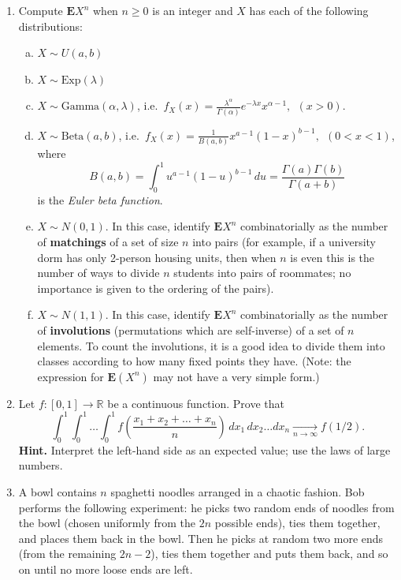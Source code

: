 \documentclass[12pt]{article}
\newcommand{\R}{\mathbb{R}}
\newcommand{\expec}{\mathbf{E}}
\theoremstyle{example}
\begin{document}
\begin{enumerate}
\item
Compute $\expec X^n$ when $n\ge 0$ is an integer and $X$ has each of the following distributions:
\begin{enumerate}[(a)]
\item $X\sim U(a,b)$
\item $X\sim \textrm{Exp}(\lambda)$
\item $X\sim \textrm{Gamma}(\alpha, \lambda)$,
i.e.\ $f_{X}(x) = \frac{\lambda^\alpha}{\Gamma(\alpha)}e^{-\lambda x} x^{\alpha-1}, \ \  (x>0)$.
\item $X\sim \textrm{Beta}(a, b)$,
i.e.\ $f_X(x) = \frac{1}{B(a,b)} x^{a-1} (1-x)^{b-1}, \ \  (0<x<1)$,
where $$ B(a,b)=\int_0^1 u^{a-1}(1-u)^{b-1}\,du = \frac{\Gamma(a)\Gamma(b)}{\Gamma(a+b)}$$
is the \emph{Euler beta function}.
\item $X\sim N(0,1)$. In this case, identify $\expec X^n$ combinatorially as the number of \textbf{matchings} of a set of size $n$ into pairs (for example, if a university dorm has only 2-person housing units, then when $n$ is even this is the number of ways to divide $n$ students into pairs of roommates; no importance is given to the ordering of the pairs).
\item $X\sim N(1,1)$. In this case, identify $\expec X^n$ combinatorially as the number of \textbf{involutions} (permutations which are self-inverse) of a set of $n$ elements. To count the involutions, it is a good idea to divide them into classes according to how many fixed points they have. (Note: the expression for $\expec(X^n)$ may not have a very simple form.) 
\end{enumerate}



\item Let $f:[0,1]\to\R$ be a continuous function. Prove that
$$ \int_0^1 \int_0^1 \ldots \int_0^1 f\left(\frac{x_1+x_2+\ldots+x_n}{n}\right)\,dx_1\,dx_2\ldots dx_n \xrightarrow[n\to\infty]{} f(1/2). $$
\textbf{Hint.} Interpret the left-hand side as an expected value; use the laws of large numbers.

\item A bowl contains $n$ spaghetti noodles arranged in a chaotic fashion. Bob performs the following experiment: he picks two random ends of noodles from the bowl (chosen uniformly from the $2n$ possible ends), ties them together, and places them back in the bowl. Then he picks at random two more ends (from the remaining $2n-2$), ties them together and puts them back, and so on until no more loose ends are left.


\end{enumerate}
\end{document}
